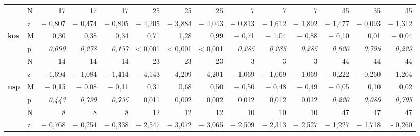 \begin{sidewaystable}
\begin{tabularx}{\textwidth}{llrrrrrrrrrrrr}
& N & 17 & 17 & 17 & \cellcolor{lsLightGreen}25 & \cellcolor{lsLightGreen}25 & \cellcolor{lsLightGreen}25 & 7 & 7 & 7 & 35 & 35 & 35\\
& z & $-$ 0,807 & $-$ 0,474 & $-$ 0,805 & \cellcolor{lsLightGreen}$-$ 4,205 & \cellcolor{lsLightGreen}$-$ 3,884 & \cellcolor{lsLightGreen}$-$ 4,043 & $-$ 0,813 & $-$ 1,612 & $-$ 1,892 & $-$ 1,477 & $-$ 0,093 & $-$ 1,312\\
\textbf{kos} & M & 0,30 & 0,38 & 0,34 & \cellcolor{lsLightGreen}0,71 & \cellcolor{lsLightGreen}1,28 & \cellcolor{lsLightGreen}0,99 & $-$ 0,71 & $-$ 1,04 & $-$ 0,88 & $-$ 0,10 & 0,01 & $-$ 0,04\\
& p & \textit{0,090} & \textit{0,278} & \textit{0,157} & \cellcolor{lsLightGreen}< 0,001 & \cellcolor{lsLightGreen}< 0,001 & \cellcolor{lsLightGreen}< 0,001 & \textit{0,285} & \textit{0,285} & \textit{0,285} & \textit{0,620} & \textit{0,795} & \textit{0,229}\\
& N & 14 & 14 & 14 & \cellcolor{lsLightGreen}23 & \cellcolor{lsLightGreen}23 & \cellcolor{lsLightGreen}23 & 3 & 3 & 3 & 44 & 44 & 44\\
& z & $-$ 1,694 & $-$ 1,084 & $-$ 1,414 & \cellcolor{lsLightGreen}$-$ 4,143 & \cellcolor{lsLightGreen}$-$ 4,209 & \cellcolor{lsLightGreen}$-$ 4,201 & $-$ 1,069 & $-$ 1,069 & $-$ 1,069 & $-$ 0,222 & $-$ 0,260 & $-$ 1,204\\
\textbf{nsp} & M & $-$ 0,15 & $-$ 0,08 & $-$ 0,11 & \cellcolor{lsLightGreen}0,31 & \cellcolor{lsLightGreen}0,68 & \cellcolor{lsLightGreen}0,50 & \cellcolor{lsLightGreen}$-$ 0,50 & \cellcolor{lsLightGreen}$-$ 0,48 & \cellcolor{lsLightGreen}$-$ 0,49 & $-$ 0,05 & 0,10 & 0,02\\
& p & \textit{0,443} & \textit{0,799} & \textit{0,735} & \cellcolor{lsLightGreen}0,011 & \cellcolor{lsLightGreen}0,002 & \cellcolor{lsLightGreen}0,002 & \cellcolor{lsLightGreen}0,012 & \cellcolor{lsLightGreen}0,012 & \cellcolor{lsLightGreen}0,012 & \textit{0,220} & \textit{0,086} & \textit{0,795}\\
& N & 8 & 8 & 8 & \cellcolor{lsLightGreen}12 & \cellcolor{lsLightGreen}12 & \cellcolor{lsLightGreen}12 & \cellcolor{lsLightGreen}10 & \cellcolor{lsLightGreen}10 & \cellcolor{lsLightGreen}10 & 47 & 47 & 47\\
& z & $-$ 0,768 & $-$ 0,254 & $-$ 0,338 & \cellcolor{lsLightGreen}$-$ 2,547 & \cellcolor{lsLightGreen}$-$ 3,072 & \cellcolor{lsLightGreen}$-$ 3,065 & \cellcolor{lsLightGreen}$-$ 2,509 & \cellcolor{lsLightGreen}$-$ 2,313 & \cellcolor{lsLightGreen}$-$ 2,527 & $-$ 1,227 & $-$ 1,718 & - 0,260\\

\end{tabularx}
\end{sidewaystable}
